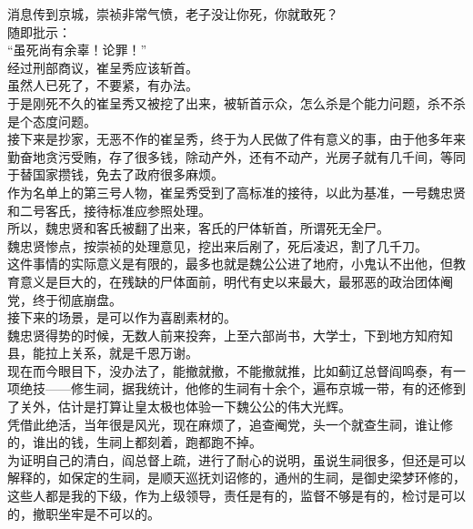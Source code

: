 \begin{multicols}{\theparacolNo}
消息传到京城，崇祯非常气愤，老子没让你死，你就敢死？\\

随即批示：\\

“虽死尚有余辜！论罪！”\\

经过刑部商议，崔呈秀应该斩首。\\

虽然人已死了，不要紧，有办法。\\

于是刚死不久的崔呈秀又被挖了出来，被斩首示众，怎么杀是个能力问题，杀不杀是个态度问题。\\

接下来是抄家，无恶不作的崔呈秀，终于为人民做了件有意义的事，由于他多年来勤奋地贪污受贿，存了很多钱，除动产外，还有不动产，光房子就有几千间，等同于替国家攒钱，免去了政府很多麻烦。\\

作为名单上的第三号人物，崔呈秀受到了高标准的接待，以此为基准，一号魏忠贤和二号客氏，接待标准应参照处理。\\

所以，魏忠贤和客氏被翻了出来，客氏的尸体斩首，所谓死无全尸。\\

魏忠贤惨点，按崇祯的处理意见，挖出来后剐了，死后凌迟，割了几千刀。\\

这件事情的实际意义是有限的，最多也就是魏公公进了地府，小鬼认不出他，但教育意义是巨大的，在残缺的尸体面前，明代有史以来最大，最邪恶的政治团体阉党，终于彻底崩盘。\\

接下来的场景，是可以作为喜剧素材的。\\

魏忠贤得势的时候，无数人前来投奔，上至六部尚书，大学士，下到地方知府知县，能拉上关系，就是千恩万谢。\\

现在而今眼目下，没办法了，能撤就撤，不能撤就推，比如蓟辽总督阎鸣泰，有一项绝技——修生祠，据我统计，他修的生祠有十余个，遍布京城一带，有的还修到了关外，估计是打算让皇太极也体验一下魏公公的伟大光辉。\\

凭借此绝活，当年很是风光，现在麻烦了，追查阉党，头一个就查生祠，谁让修的，谁出的钱，生祠上都刻着，跑都跑不掉。\\

为证明自己的清白，阎总督上疏，进行了耐心的说明，虽说生祠很多，但还是可以解释的，如保定的生祠，是顺天巡抚刘诏修的，通州的生祠，是御史梁梦环修的，这些人都是我的下级，作为上级领导，责任是有的，监督不够是有的，检讨是可以的，撤职坐牢是不可以的。\\


\end{multicols}
